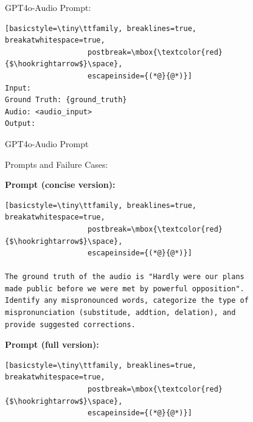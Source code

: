 \documentclass[11pt]{article}
\begin{document}
\begin{figure}[ht]
\begin{AIBox}{GPT4o-Audio Prompt:}
\begin{minipage}[t]{\textwidth}
\begin{lstlisting}[basicstyle=\tiny\ttfamily, breaklines=true, breakatwhitespace=true,
                   postbreak=\mbox{\textcolor{red}{$\hookrightarrow$}\space},
                   escapeinside={(*@}{@*)}]
Input:
Ground Truth: {ground_truth}
Audio: <audio_input>
Output:
\end{lstlisting}
\end{minipage}

\end{AIBox}
\caption{GPT4o-Audio Prompt}
\label{fig:gpt4o_prompt}
\end{figure}

\begin{figure}[ht]
\begin{AIBox}{Prompts and Failure Cases:}

\begin{minipage}[t]{\textwidth}
{\bf Prompt (concise version):} \scriptsize
\begin{lstlisting}[basicstyle=\tiny\ttfamily, breaklines=true, breakatwhitespace=true,
                   postbreak=\mbox{\textcolor{red}{$\hookrightarrow$}\space},
                   escapeinside={(*@}{@*)}]

The ground truth of the audio is "Hardly were our plans made public before we were met by powerful opposition". Identify any mispronounced words, categorize the type of mispronunciation (substitude, addtion, delation), and provide suggested corrections.
\end{lstlisting}
\end{minipage}

\tcbline


\begin{minipage}[t]{\textwidth}
{\bf Prompt (full version):} \scriptsize
\begin{lstlisting}[basicstyle=\tiny\ttfamily, breaklines=true, breakatwhitespace=true,
                   postbreak=\mbox{\textcolor{red}{$\hookrightarrow$}\space},
                   escapeinside={(*@}{@*)}]


\end{lstlisting}
\end{minipage}
\end{AIBox}
\end{figure}
\end{document}
